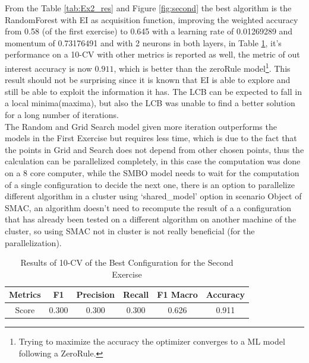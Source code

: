 \documentclass[12pt, onecolumn]{article}
\begin{document}
From the Table \ref{tab:Ex2_res} and Figure \ref{fig:second} the best algorithm is the RandomForest with EI as acquisition function, improving the weighted accuracy from 0.58 (of the first exercise) to 0.645 with a learning rate of 0.01269289 and momentum of 0.73176491 and with 2 neurons in both layers, in Table \ref{tab:best_2}, it's performance on a 10-CV with other metrics is reported as well, the metric of out interest accuracy is now $0.911$, which is better than the zeroRule model\footnote{Trying to maximize the accuracy the optimizer converges to a ML model following a ZeroRule.}.
This result should not be surprising since it is known that EI is able to explore and still be able to exploit the information it has.
The LCB can be expected to fall in a local minima(maxima), but also the LCB was unable to find a better solution for a long number of iterations.\\
The Random and Grid Search model given more iteration outperforms the models in the First Exercise but requires less time, which is due to the fact that the points in Grid and Search does not depend from other chosen points, thus the calculation can be parallelized completely, in this case the computation was done on a 8 core computer, while the SMBO model needs to wait for the computation of a single configuration to decide the next one, there is an option to parallelize different algorithm in a cluster using `shared\_model' option in scenario Object of SMAC, an algorithm doesn't need to recompute the result of a a configuration that has already been tested on a different algorithm on another machine of the cluster, so using SMAC not in cluster is not really beneficial (for the parallelization). 
\begin{table}[!h]
  \centering
  \begin{tabular}{ |c|c|c|c|c|c| } 
    \hline
    Metrics& F1 & Precision & Recall & F1 Macro & Accuracy\\
    \hline
    Score& 0.300 & 0.300 & 0.300 & 0.626 & 0.911\\
    \hline
  \end{tabular}
  \caption{Results of 10-CV of the Best Configuration for the Second Exercise}
  \label{tab:best_2}
\end{table}
\end{document}
